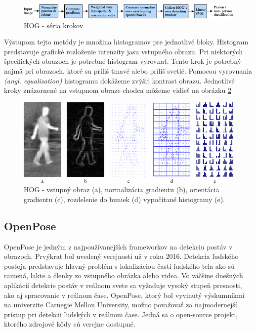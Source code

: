 \documentclass[slovak,master,dept460,male,cpp,cpdeclaration]{diploma}
\begin{document}
\begin{figure}[H]
	\centering
	\includegraphics[width=1\textwidth]{Figures/hog.png}
	\caption{HOG - séria krokov \cite{dalal2005}}
	\label{fig:HOG1}
\end{figure}

Výstupom tejto metódy je množina histogramov pre jednotlivé bloky. Histogram predstavuje grafické rozloženie intenzity jasu vstupného obrazu. Pri niektorých špecifických obrazoch je potrebné histogram vyrovnať. Tento krok je potrebný najmä pri obrazoch, ktoré su príliš tmavé alebo príliš svetlé. Pomocou vyrovnania \textit{(angl. equalization)} histogramu  dokážeme zvýšiť kontrast obrazu. Jednotlivé kroky znázornené na vstupnom obraze chodca môžeme vidieť na obrázku \ref{fig:HOG2}\par


\begin{figure}[H]
	\centering
	\includegraphics[width=1\textwidth]{Figures/hog3.png}
	\caption{HOG - vstupný obraz (a), normalizácia gradientu (b), orientácia gradientu (c), rozdelenie do buniek (d) vypočítané histogramy (e). \cite{bertozzi2007pedestrian}}
	\label{fig:HOG2}
\end{figure}


\newpage
\subsection{OpenPose}
OpenPose\cite{cao2018openpose} je jedným z najpoužívanejších frameworkov na detekciu postáv v obrazoch. Prvýkrat bol uvedený verejnosti už v roku 2016. Detekcia ľudského postoja predstavuje hlavný problém s lokalizáciou častí ľudského tela ako sú ramená, lakte a členky zo vstupného obrázka alebo videa. Vo väčšine dnešných aplikácií detekcie postáv v reálnom svete sa vyžaduje vysoký stupeň presnosti, ako aj spracovanie v reálnom čase.
OpenPose, ktorý bol vyvinutý výskumníkmi na univerzite Carnegie Mellon University, možno považovať za najmodernejší prístup pri detekcii ľudských v reálnom čase. Jedná sa o open-source projekt, ktorého zdrojové kôdy sú verejne dostupné\cite{githubOpenpose}.
\end{document}
